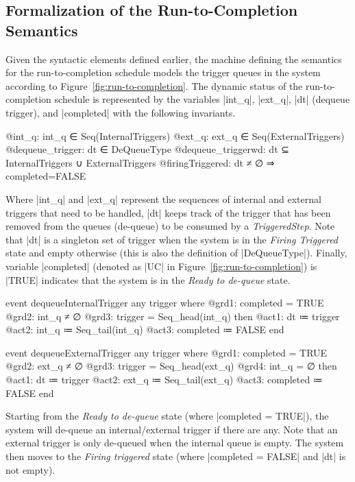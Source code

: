 \subsection{Formalization of the Run-to-Completion Semantics}
\label{sec:r2c-semantics}
Given the syntactic elements defined earlier, the machine defining the semantics for the run-to-completion schedule models the trigger queues in the system according to Figure~\ref{fig:run-to-completion}. The dynamic status of the run-to-completion schedule is represented by the variables |int_q|, |ext_q|, |dt| (dequeue trigger), and |completed| with the following invariants.
\begin{EventBcode}
	@int_q: int_q ∈ Seq(InternalTriggers)
	@ext_q: ext_q ∈ Seq(ExternalTriggers)
	@dequeue_trigger: dt ∈ DeQueueType
	@dequeue_triggerwd:	dt ⊆ InternalTriggers ∪ ExternalTriggers
	@firingTriggered: dt ≠ ∅ ⇒ completed=FALSE
\end{EventBcode}
Where |int_q| and |ext_q| represent the sequences of internal and external triggers that need to be handled, |dt| keeps track of the trigger that has been removed from the queues (de-queue) to be consumed by a \emph{TriggeredStep}. Note that |dt| is a singleton set of trigger when the system is in the \emph{Firing Triggered} state and empty otherwise (this is also the definition of |DeQueueType|). Finally, variable |completed| (denoted as |UC| in Figure~\ref{fig:run-to-completion}) is |TRUE| indicates that the system is in the \emph{Ready to de-queue} state.
\begin{center}
\begin{minipage}[t]{0.48\textwidth}
\begin{EventBcode}
event dequeueInternalTrigger
any trigger where 
	@grd1: completed = TRUE
	@grd2: int_q ≠ ∅
	@grd3: trigger = Seq_head(int_q)
then 
	@act1: dt ≔ {trigger}
	@act2: int_q ≔ Seq_tail(int_q) 
	@act3: completed ≔ FALSE
end
\end{EventBcode}
\end{minipage}
\hfill
\begin{minipage}[t]{0.48\textwidth}
\begin{EventBcode}
event dequeueExternalTrigger
any trigger where 
    @grd1: completed = TRUE
    @grd2: ext_q ≠ ∅
    @grd3: trigger = Seq_head(ext_q)
    @grd4: int_q = ∅
then 
    @act1: dt ≔ {trigger}
    @act2: ext_q ≔ Seq_tail(ext_q)
    @act3: completed ≔ FALSE
end
\end{EventBcode}
\end{minipage}
\end{center}
Starting from the \emph{Ready to de-queue} state (where |completed = TRUE|), the system will de-queue an internal/external trigger if there are any. Note that an external trigger is only de-queued when the internal queue is empty. The system then moves to the \emph{Firing triggered} state (where |completed = FALSE| and |dt| is not empty).


